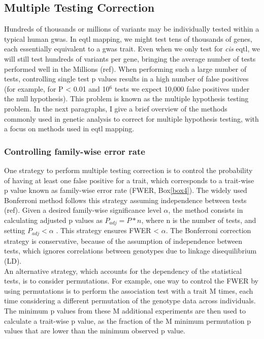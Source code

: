 \subsection{Multiple Testing Correction}

Hundreds of thousands or millions of variants may be individually tested within a typical human \gls{gwas}. 
In e\gls{qtl} mapping, we might test tens of thousands of genes, each essentially equivalent to a \gls{gwas} trait. 
Even when we only test for \textit{cis} e\gls{qtl}, we will still test hundreds of variants per gene, bringing the average number of tests performed well in the Millions (ref).  
When performing such a large number of tests, controlling single test p values results in a high number of false positives (for example, for P < 0.01 and 10$^6$ tests we expect 10,000 false positives under the null hypothesis). 
This problem is known as the multiple hypothesis testing problem. 
In the next paragraphs, I give a brief overview of the methods commonly used in genetic analysis to correct for multiple hypothesis testing, with a focus on methods used in e\gls{qtl} mapping.

\subsubsection{Controlling family-wise error rate} 

One strategy to perform multiple testing correction is to control the probability of having at least one false positive for a trait, which corresponds to a trait-wise p value known as family-wise error rate (FWER, Box\ref{box4}).
The widely used Bonferroni method follows this strategy assuming independence between tests (ref). 
Given a desired family-wise significance level $\alpha$, the method consists in calculating adjusted p values as $P_{adj} = P*n $, where n is the number of tests, and setting $P_{adj} < \alpha$ . 
This strategy ensures FWER < $\alpha$. 
The Bonferroni correction strategy is conservative, because of the assumption of independence between tests, which ignores correlations between genotypes due to linkage disequilibrium (LD).\\

An alternative strategy, which accounts for the dependency of the statistical tests, is to consider permutations. 
For example, one way to control the FWER by using permutations is to perform the association test with a trait M times, each time considering a different permutation of the genotype data across individuals.
The minimum p values from these M additional experiments are then used to calculate a trait-wise p value, as the fraction of the M minimum permutation p values that are lower than the minimum observed p value. 

